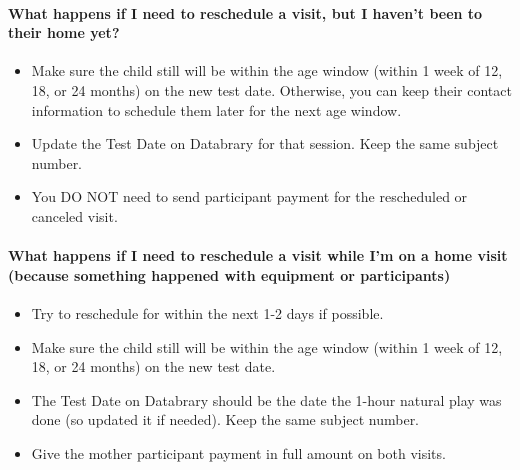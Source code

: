 \documentclass[
  12pt,
]{book}
\providecommand{\tightlist}{%
  \setlength{\itemsep}{0pt}\setlength{\parskip}{0pt}}
\begin{document}
\hypertarget{what-happens-if-i-need-to-reschedule-a-visit-but-i-havent-been-to-their-home-yet}{%
\paragraph*{What happens if I need to reschedule a visit, but I haven't been to their home yet?}\label{what-happens-if-i-need-to-reschedule-a-visit-but-i-havent-been-to-their-home-yet}}

\begin{itemize}
\tightlist
\item
  Make sure the child still will be within the age window (within 1 week of 12, 18, or 24 months) on the new test date. Otherwise, you can keep their contact information to schedule them later for the next age window.
\item
  Update the Test Date on Databrary for that session. Keep the same subject number.
\item
  You DO NOT need to send participant payment for the rescheduled or canceled visit.
\end{itemize}

\hypertarget{what-happens-if-i-need-to-reschedule-a-visit-while-im-on-a-home-visit-because-something-happened-with-equipment-or-participants}{%
\paragraph*{What happens if I need to reschedule a visit while I'm on a home visit (because something happened with equipment or participants)}\label{what-happens-if-i-need-to-reschedule-a-visit-while-im-on-a-home-visit-because-something-happened-with-equipment-or-participants}}

\begin{itemize}
\tightlist
\item
  Try to reschedule for within the next 1-2 days if possible.
\item
  Make sure the child still will be within the age window (within 1 week of 12, 18, or 24 months) on the new test date.
\item
  The Test Date on Databrary should be the date the 1-hour natural play was done (so updated it if needed). Keep the same subject number.
\item
  Give the mother participant payment in full amount on both visits.
\end{itemize}
\end{document}
